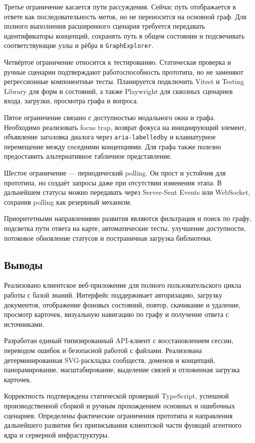 Третье ограничение касается пути рассуждения. Сейчас путь отображается в ответе как последовательность меток, но не переносится на основной граф. Для полного выполнения расширенного сценария требуется передавать идентификаторы концепций, сохранять путь в общем состоянии и подсвечивать соответствующие узлы и рёбра в \texttt{GraphExplorer}.

Четвёртое ограничение относится к тестированию. Статическая проверка и ручные сценарии подтверждают работоспособность прототипа, но не заменяют регрессионные компонентные тесты. Планируется подключить Vitest и Testing Library для форм и состояний, а также Playwright для сквозных сценариев входа, загрузки, просмотра графа и вопроса.

Пятое ограничение связано с доступностью модального окна и графа. Необходимо реализовать focus trap, возврат фокуса на инициирующий элемент, объявление заголовка диалога через \texttt{aria-labelledby} и клавиатурное перемещение между соседними концепциями. Для графа также полезно предоставить альтернативное табличное представление.

Шестое ограничение --- периодический polling. Он прост и устойчив для прототипа, но создаёт запросы даже при отсутствии изменения этапа. В дальнейшем статусы можно передавать через Server-Sent Events или WebSocket, сохранив polling как резервный механизм.

Приоритетными направлениями развития являются фильтрация и поиск по графу, подсветка пути ответа на карте, автоматические тесты, улучшение доступности, потоковое обновление статусов и постраничная загрузка библиотеки.

\subsection{Выводы}

Реализовано клиентское веб-приложение для полного пользовательского цикла работы с базой знаний. Интерфейс поддерживает авторизацию, загрузку документов, отображение фоновых состояний, повтор, скачивание и удаление, просмотр карточек, визуальную навигацию по графу и получение ответа с источниками.

Разработан единый типизированный API-клиент с восстановлением сессии, переводом ошибок и безопасной работой с файлами. Реализована детерминированная SVG-раскладка сообществ, доменов и концепций, панорамирование, масштабирование, выделение связей и отложенная загрузка карточек.

Корректность подтверждена статической проверкой TypeScript, успешной производственной сборкой и ручным прохождением основных и ошибочных сценариев. Определены фактические ограничения прототипа и направления дальнейшего развития без приписывания клиентской части функций агентного ядра и серверной инфраструктуры.
